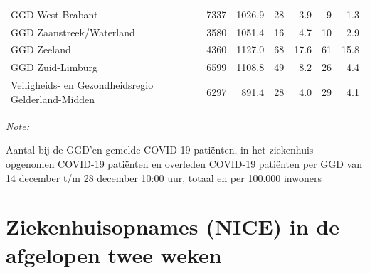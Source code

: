 \documentclass[
  english,
  man,floatsintext]{apa6}
\begin{document}
\begin{table}
\begin{threeparttable}
\begin{tabular}{lrrrrrr}
GGD West-Brabant & 7337 & 1026.9 & 28 & 3.9 & 9 & 1.3\\
GGD Zaanstreek/Waterland & 3580 & 1051.4 & 16 & 4.7 & 10 & 2.9\\
GGD Zeeland & 4360 & 1127.0 & 68 & 17.6 & 61 & 15.8\\
GGD Zuid-Limburg & 6599 & 1108.8 & 49 & 8.2 & 26 & 4.4\\
Veiligheids- en Gezondheidsregio Gelderland-Midden & 6297 & 891.4 & 28 & 4.0 & 29 & 4.1\\
\bottomrule
\end{tabular}
\begin{tablenotes}
\item \textit{Note: } 
\item Aantal bij de GGD’en gemelde COVID-19 patiënten, in het ziekenhuis opgenomen COVID-19 patiënten en overleden COVID-19 patiënten per GGD van 14 december t/m 28 december 10:00 uur, totaal en per 100.000 inwoners
\end{tablenotes}
\end{threeparttable}
\endgroup{}
\end{table}

\newpage

\hypertarget{ziekenhuisopnames-nice-in-de-afgelopen-twee-weken}{%
\section{Ziekenhuisopnames (NICE) in de afgelopen twee weken}\label{ziekenhuisopnames-nice-in-de-afgelopen-twee-weken}}
\end{document}
